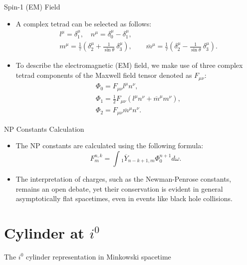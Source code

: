 \documentclass{beamer}
\theoremstyle{remark}
\theoremstyle{plain}
\theoremstyle{plain}
\begin{document}
\begin{frame}{Spin-1 (EM) Field}
  \begin{itemize}
    \item A complex tetrad can be selected as follows:
      \begin{align}\label{eq:tetrad}
        & l^{\mu} = \delta_{1}^{\mu}, \quad n^{\mu} = \delta_{0}^{\mu} - \delta_{1}^{\mu}, \nonumber \\
        & m^{\mu} = \displaystyle\frac{1}{\tau}\left(\delta_{2}^{\mu} + \displaystyle\frac{1}{\sin\theta}\ \delta_{3}^{\mu}\right), \qquad \overline{m}^{\mu} = \displaystyle\frac{1}{\tau}\left(\delta_{2}^{\mu} - \displaystyle\frac{1}{\sin\theta}\ \delta_{3}^{\mu}\right).
      \end{align}
    \item To describe the electromagnetic (EM) field, we make use of three complex tetrad components of the Maxwell field tensor denoted as $F_{\mu \nu}$:
      \begin{align}\label{eq:Maxtensor}
        & \Phi_{0} = F_{\mu \nu}l^{\mu}n^{\nu}, \nonumber \\
        & \Phi_{1} = \frac{1}{2} F_{\mu \nu}(l^{\mu}n^{\nu} + \overline{m}^{\mu}m^{\nu}), \nonumber \\
        & \Phi_{2} = F_{\mu \nu}\overline{m}^{\mu}n^{\nu}.
      \end{align}
  \end{itemize}
\end{frame}

\begin{frame}{NP Constants Calculation}
  \begin{itemize}
    \item The NP constants are calculated using the following formula:
    \begin{equation}
      F_{m}^{n,k} = \int{_{1}\overline{Y}_{n-k+1,m}\Phi_{0}^{n+1} d\omega}.
    \end{equation}
    \item The interpretation of charges, such as the Newman-Penrose constants, remains an open debate, yet their conservation is evident in general asymptotically flat spacetimes, even in events like black hole collisions.
  \end{itemize}
\end{frame}
\section{Cylinder at $i^0$}
\begin{frame}{The $i^0$ cylinder representation in Minkowski  spacetime}
\end{frame}
\end{document}
